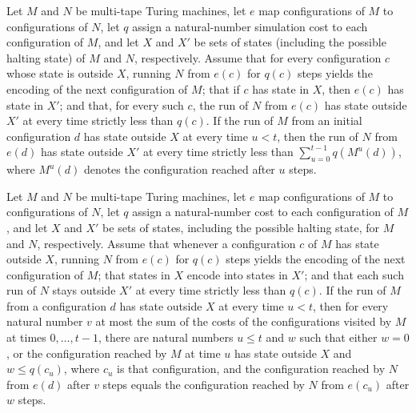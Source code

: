 \begin{theorem}
\label{Turing.Lockstep.cut}
\leanok
{}
Let $M$ and $N$ be multi-tape Turing machines, let $e$ map configurations of $M$ to
configurations of $N$, let $q$ assign a natural-number simulation cost to each
configuration of $M$, and let $X$ and $X'$ be sets of states (including the possible
halting state) of $M$ and $N$, respectively. Assume that for every configuration $c$
whose state is outside $X$, running $N$ from $e(c)$ for $q(c)$ steps yields the encoding
of the next configuration of $M$; that if $c$ has state in $X$, then $e(c)$ has state in
$X'$; and that, for every such $c$, the run of $N$ from $e(c)$ has state outside $X'$ at
every time strictly less than $q(c)$. If the run of $M$ from an initial configuration
$d$ has state outside $X$ at every time $u<t$, then the run of $N$ from $e(d)$ has state
outside $X'$ at every time strictly less than $\sum_{u=0}^{t-1} q(M^u(d))$, where
$M^u(d)$ denotes the configuration reached after $u$ steps.
\end{theorem}

\begin{theorem}
\label{Turing.Lockstep.locate}
\leanok
{}
Let $M$ and $N$ be multi-tape Turing machines, let $e$ map configurations of $M$ to
configurations of $N$, let $q$ assign a natural-number cost to each configuration of
$M$, and let $X$ and $X'$ be sets of states, including the possible halting state, for
$M$ and $N$, respectively. Assume that whenever a configuration $c$ of $M$ has state
outside $X$, running $N$ from $e(c)$ for $q(c)$ steps yields the encoding of the next
configuration of $M$; that states in $X$ encode into states in $X'$; and that each such
run of $N$ stays outside $X'$ at every time strictly less than $q(c)$. If the run of $M$
from a configuration $d$ has state outside $X$ at every time $u<t$, then for every
natural number $v$ at most the sum of the costs of the configurations visited by $M$ at
times $0,\ldots,t-1$, there are natural numbers $u\le t$ and $w$ such that either $w=0$,
or the configuration reached by $M$ at time $u$ has state outside $X$ and $w\le q(c_u)$,
where $c_u$ is that configuration, and the configuration reached by $N$ from $e(d)$
after $v$ steps equals the configuration reached by $N$ from $e(c_u)$ after $w$ steps.
\end{theorem}

